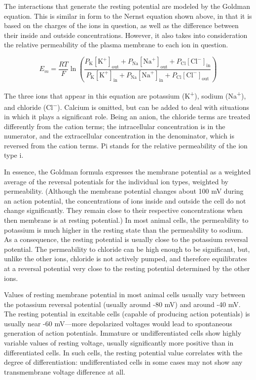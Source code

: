 \documentclass[]{book}
\begin{document}
The interactions that generate the resting potential are modeled by the Goldman equation. This is similar in form to the Nernst equation shown above, in that it is based on the charges of the ions in question, as well as the difference between their inside and outside concentrations. However, it also takes into consideration the relative permeability of the plasma membrane to each ion in question.

\[ E_{m} = \frac{RT}{F} \ln{ \left( \frac{ P_{\mathrm{K}}[\mathrm{K}^{+}]_\mathrm{out} + P_{\mathrm{Na}}[\mathrm{Na}^{+}]_\mathrm{out} + P_{\mathrm{Cl}}[\mathrm{Cl}^{-}]_\mathrm{in}}{ P_{\mathrm{K}}[\mathrm{K}^{+}]_\mathrm{in} + P_{\mathrm{Na}}[\mathrm{Na}^{+}]_\mathrm{in} + P_{\mathrm{Cl}}[\mathrm{Cl}^{-}]_\mathrm{out}} \right) } \]

The three ions that appear in this equation are potassium (K\textsuperscript{+}), sodium (Na\textsuperscript{+}), and chloride (Cl\textsuperscript{−}). Calcium is omitted, but can be added to deal with situations in which it plays a significant role. Being an anion, the chloride terms are treated differently from the cation terms; the intracellular concentration is in the numerator, and the extracellular concentration in the denominator, which is reversed from the cation terms. Pi stands for the relative permeability of the ion type i.

In essence, the Goldman formula expresses the membrane potential as a weighted average of the reversal potentials for the individual ion types, weighted by permeability. (Although the membrane potential changes about 100 mV during an action potential, the concentrations of ions inside and outside the cell do not change significantly. They remain close to their respective concentrations when then membrane is at resting potential.) In most animal cells, the permeability to potassium is much higher in the resting state than the permeability to sodium. As a consequence, the resting potential is usually close to the potassium reversal potential. The permeability to chloride can be high enough to be significant, but, unlike the other ions, chloride is not actively pumped, and therefore equilibrates at a reversal potential very close to the resting potential determined by the other ions.

Values of resting membrane potential in most animal cells usually vary between the potassium reversal potential (usually around -80 mV) and around -40 mV. The resting potential in excitable cells (capable of producing action potentials) is usually near -60 mV---more depolarized voltages would lead to spontaneous generation of action potentials. Immature or undifferentiated cells show highly variable values of resting voltage, usually significantly more positive than in differentiated cells. In such cells, the resting potential value correlates with the degree of differentiation: undifferentiated cells in some cases may not show any transmembrane voltage difference at all.
\end{document}
